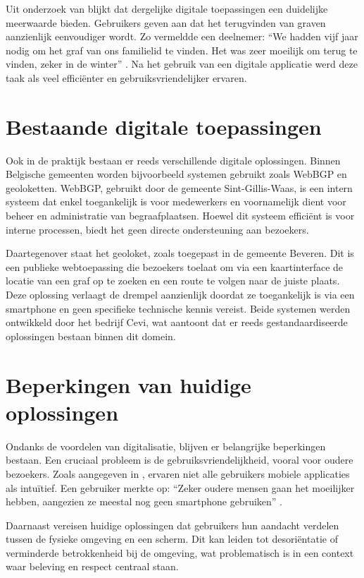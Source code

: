 Uit onderzoek van \Autocite{Haekkilae2022} blijkt dat dergelijke digitale toepassingen een duidelijke meerwaarde bieden. Gebruikers geven aan dat het terugvinden van graven aanzienlijk eenvoudiger wordt. Zo vermeldde een deelnemer: “We hadden vijf jaar nodig om het graf van ons familielid te vinden. Het was zeer moeilijk om terug te vinden, zeker in de winter” \Autocite{Haekkilae2022}. Na het gebruik van een digitale applicatie werd deze taak als veel efficiënter en gebruiksvriendelijker ervaren.

\section{Bestaande digitale toepassingen}

Ook in de praktijk bestaan er reeds verschillende digitale oplossingen. Binnen Belgische gemeenten worden bijvoorbeeld systemen gebruikt zoals WebBGP en geoloketten. WebBGP, gebruikt door de gemeente Sint-Gillis-Waas, is een intern systeem dat enkel toegankelijk is voor medewerkers en voornamelijk dient voor beheer en administratie van begraafplaatsen. Hoewel dit systeem efficiënt is voor interne processen, biedt het geen directe ondersteuning aan bezoekers.

Daartegenover staat het geoloket, zoals toegepast in de gemeente Beveren. Dit is een publieke webtoepassing die bezoekers toelaat om via een kaartinterface de locatie van een graf op te zoeken en een route te volgen naar de juiste plaats. Deze oplossing verlaagt de drempel aanzienlijk doordat ze toegankelijk is via een smartphone en geen specifieke technische kennis vereist. Beide systemen werden ontwikkeld door het bedrijf Cevi, wat aantoont dat er reeds gestandaardiseerde oplossingen bestaan binnen dit domein.

\section{Beperkingen van huidige oplossingen}

Ondanks de voordelen van digitalisatie, blijven er belangrijke beperkingen bestaan. Een cruciaal probleem is de gebruiksvriendelijkheid, vooral voor oudere bezoekers. Zoals aangegeven in \Autocite{Haekkilae2022}, ervaren niet alle gebruikers mobiele applicaties als intuïtief. Een gebruiker merkte op: “Zeker oudere mensen gaan het moeilijker hebben, aangezien ze meestal nog geen smartphone gebruiken” \Autocite{Haekkilae2022}.

Daarnaast vereisen huidige oplossingen dat gebruikers hun aandacht verdelen tussen de fysieke omgeving en een scherm. Dit kan leiden tot desoriëntatie of verminderde betrokkenheid bij de omgeving, wat problematisch is in een context waar beleving en respect centraal staan.


